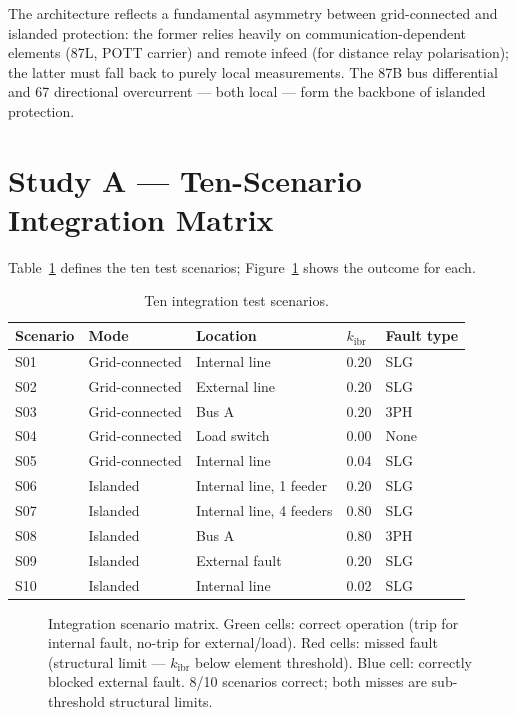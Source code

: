 \documentclass[11pt,a4paper]{article}
\begin{document}
\noindent
The architecture reflects a fundamental asymmetry between grid-connected and
islanded protection: the former relies heavily on communication-dependent elements
(87L, POTT carrier) and remote infeed (for distance relay polarisation); the
latter must fall back to purely local measurements.  The 87B bus differential and
67 directional overcurrent --- both local --- form the backbone of islanded
protection.

\section{Study A --- Ten-Scenario Integration Matrix}
\label{sec:studyA}

Table~\ref{tab:scenarios} defines the ten test scenarios; Figure~\ref{fig:matrix}
shows the outcome for each.

\begin{table}[htbp]
\centering
\caption{Ten integration test scenarios.}
\label{tab:scenarios}
\begin{tabular}{@{}lllll@{}}
\toprule
Scenario & Mode & Location & $k_\mathrm{ibr}$ & Fault type \\
\midrule
S01 & Grid-connected & Internal line & 0.20 & SLG \\
S02 & Grid-connected & External line & 0.20 & SLG \\
S03 & Grid-connected & Bus A & 0.20 & 3PH \\
S04 & Grid-connected & Load switch & 0.00 & None \\
S05 & Grid-connected & Internal line & 0.04 & SLG \\
S06 & Islanded & Internal line, 1 feeder & 0.20 & SLG \\
S07 & Islanded & Internal line, 4 feeders & 0.80 & SLG \\
S08 & Islanded & Bus A & 0.80 & 3PH \\
S09 & Islanded & External fault & 0.20 & SLG \\
S10 & Islanded & Internal line & 0.02 & SLG \\
\bottomrule
\end{tabular}
\end{table}

\begin{figure}[htbp]
  \centering
  \resizebox{0.84\textwidth}{!}{}
  \caption{Integration scenario matrix.  Green cells: correct operation
           (trip for internal fault, no-trip for external/load).  Red cells:
           missed fault (structural limit --- $k_\mathrm{ibr}$ below element
           threshold).  Blue cell: correctly blocked external fault.
           8/10 scenarios correct; both misses are sub-threshold structural limits.}
  \label{fig:matrix}
\end{figure}
\end{document}
